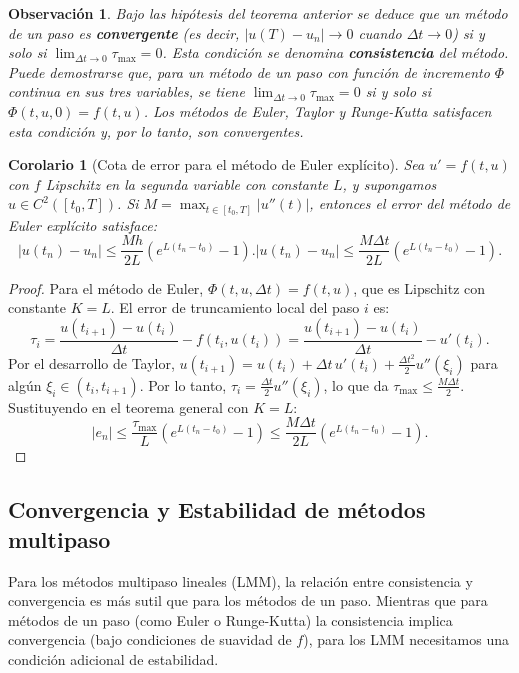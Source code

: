 \documentclass[a4paper,11pt]{report}
\newtheorem{corollary}[theorem]{Corolario}
\newtheorem{remark}[theorem]{Observación}
\begin{document}
\begin{remark}
Bajo las hipótesis del teorema anterior se deduce que un método de un paso es \textbf{convergente} (es decir, $|u(T) - u_n| \to 0$ cuando $\Delta t \to 0$) si y solo si $\lim_{\Delta t \to 0}\tau_{\max} = 0$. Esta condición se denomina \textbf{consistencia} del método. Puede demostrarse que, para un método de un paso con función de incremento $\Phi$ continua en sus tres variables, se tiene $\lim_{\Delta t \to 0}\tau_{\max} = 0$ si y solo si $\Phi(t, u, 0) = f(t, u)$. Los métodos de Euler, Taylor y Runge-Kutta satisfacen esta condición y, por lo tanto, son convergentes.
\end{remark}

\begin{corollary}[Cota de error para el método de Euler explícito]\label{cor:error_euler}
Sea $u' = f(t,u)$ con $f$ Lipschitz en la segunda variable con constante $L$, y supongamos $u \in C^2([t_0, T])$. Si $M = \max_{t \in [t_0,T]} |u''(t)|$, entonces el error del método de Euler explícito satisface:
\[
|u(t_n) - u_n| \leq \frac{Mh}{2L}\left(e^{L(t_n - t_0)} - 1\right).
|u(t_n) - u_n| \leq \frac{M\Delta t}{2L}\left(e^{L(t_n - t_0)} - 1\right).
\]
\end{corollary}

\begin{proof}
Para el método de Euler, $\Phi(t, u, \Delta t) = f(t, u)$, que es Lipschitz con constante $K = L$. El error de truncamiento local del paso $i$ es:
\[
\tau_i = \frac{u(t_{i+1}) - u(t_i)}{\Delta t} - f(t_i, u(t_i)) = \frac{u(t_{i+1}) - u(t_i)}{\Delta t} - u'(t_i).
\]
Por el desarrollo de Taylor, $u(t_{i+1}) = u(t_i) + \Delta t\,u'(t_i) + \frac{\Delta t^2}{2} u''(\xi_i)$ para algún $\xi_i \in (t_i, t_{i+1})$. Por lo tanto, $\tau_i = \frac{\Delta t}{2}u''(\xi_i)$, lo que da $\tau_{\max} \leq \frac{M\Delta t}{2}$. Sustituyendo en el teorema general con $K = L$:
\[
|e_n| \leq \frac{\tau_{\max}}{L}(e^{L(t_n - t_0)} - 1) \leq \frac{M\Delta t}{2L}(e^{L(t_n - t_0)} - 1).
\]
\end{proof}

\subsection{Convergencia y Estabilidad de métodos multipaso}

Para los métodos multipaso lineales (LMM), la relación entre consistencia y convergencia es más sutil que para los métodos de un paso. Mientras que para métodos de un paso (como Euler o Runge-Kutta) la consistencia implica convergencia (bajo condiciones de suavidad de $f$), para los LMM necesitamos una condición adicional de estabilidad.
\end{document}
